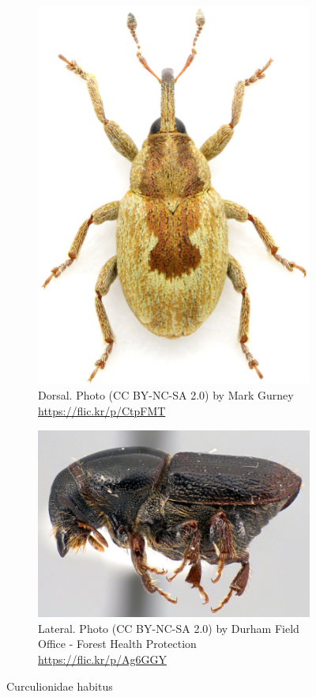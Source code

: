\documentclass[letterpaper, 11pt]{article}
\begin{document}
\begin{figure}[ht!]
  \centering
\begin{subfigure}[ht!]{0.35\textwidth}
    \includegraphics[width=\textwidth]{Curculionid1}
  \caption{Dorsal. Photo (CC BY-NC-SA 2.0) by Mark Gurney \url{https://flic.kr/p/CtpFMT}}
  \label{fig:curculionid1}
\end{subfigure}
    \qquad
\begin{subfigure}[ht!]{0.5\textwidth}
    \includegraphics[width=\textwidth]{Curculionid4}
  \caption{Lateral. Photo (CC BY-NC-SA 2.0) by Durham Field Office - Forest Health Protection \url{https://flic.kr/p/Ag6GGY}}
  \label{fig:curculionid2}
\end{subfigure}
    \caption{Curculionidae habitus}\label{fig:curculionids}
\end{figure}
\end{document}

